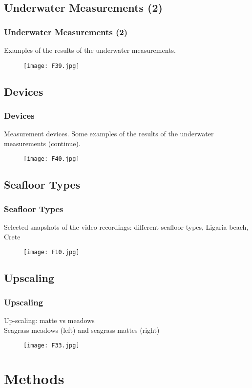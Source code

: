\documentclass[pdflatex,compress]{beamer}
\begin{document}
\subsection{Underwater Measurements (2)}
\begin{frame}\frametitle{Underwater Measurements (2)}
Examples of the results of the underwater measurements.
\begin{figure}[H]
	\centering
		\texttt{[image: F39.jpg]}
\end{figure}
\end{frame}

\subsection{Devices}
\begin{frame}\frametitle{Devices}
Measurement devices. 
Some examples of the results of the underwater measurements (continue).
\begin{figure}[H]
	\centering
		\texttt{[image: F40.jpg]}
\end{figure}
\end{frame}

\subsection{Seafloor Types}
\begin{frame}\frametitle{Seafloor Types}
\scriptsize{Selected snapshots of the video recordings: different seafloor types, Ligaria beach, Crete}
\begin{figure}[H]
	\centering
		\texttt{[image: F10.jpg]}
\end{figure}
\end{frame}

\subsection{Upscaling}
\begin{frame}\frametitle{Upscaling}
Up-scaling: matte vs meadows\\
Seagrass meadows (left) and seagrass mattes (right)
\begin{figure}[H]
	\centering
		\texttt{[image: F33.jpg]}
\end{figure}
\end{frame}

\section{Methods}
\end{document}

